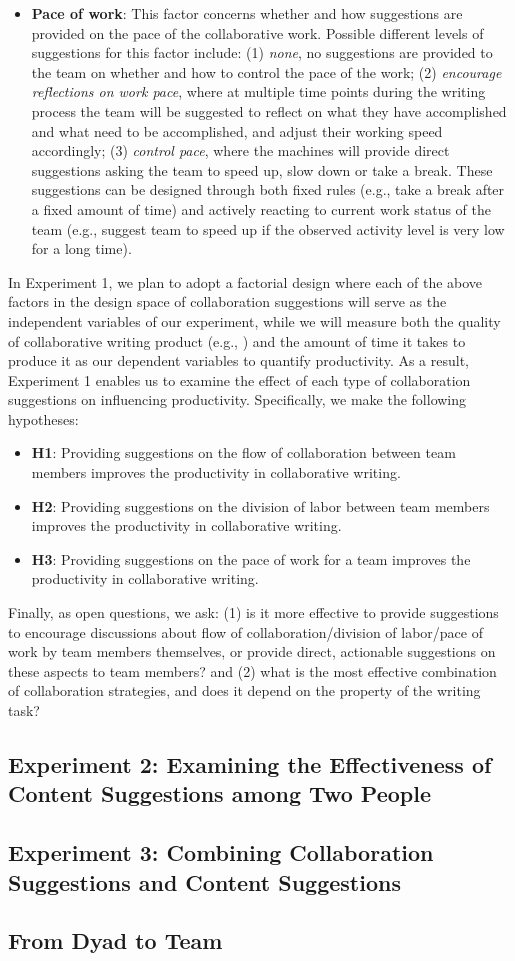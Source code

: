 \begin{itemize}
\item {\bf Pace of work}: This factor concerns whether and how suggestions are provided on the pace of the collaborative work. Possible different levels of suggestions for this factor include: (1) {\em none}, no suggestions are provided to the team on whether and how to control the pace of the work; (2) {\em encourage reflections on work pace}, where at multiple time points during the writing process the team will be suggested to reflect on what they have accomplished and what need to be accomplished, and adjust their working speed accordingly; (3) {\em control pace}, where the machines will provide direct suggestions asking the team to speed up, slow down or take a break. These suggestions can be designed through both fixed rules (e.g., take a break after a fixed amount of time) and actively reacting to current work status of the team (e.g., suggest team to speed up if the observed activity level is very low for a long time). 
\end{itemize}

In Experiment 1, we plan to adopt a factorial design where each of the above factors in the design space of collaboration suggestions will serve as the independent variables of our experiment, while we will measure both the quality of collaborative writing product (e.g., ) and the amount of time it takes to produce it as our dependent variables to quantify productivity. As a result, Experiment 1 enables us to examine the effect of each type of collaboration suggestions on influencing productivity. Specifically, we make the following hypotheses:
\begin{itemize}
\item{\bf H1}: Providing suggestions on the flow of collaboration between team members improves the productivity in collaborative writing.
\item{\bf H2}: Providing suggestions on the division of labor between team members improves the productivity in collaborative writing.
\item{\bf H3}: Providing suggestions on the pace of work for a team improves the productivity in collaborative writing.
\end{itemize}
Finally, as open questions, we ask: (1) is it more effective to provide suggestions to encourage discussions about flow of collaboration/division of labor/pace of work by team members themselves, or provide direct, actionable suggestions on these aspects to team members? and (2) what is the most effective combination of collaboration strategies, and does it depend on the property of the writing task?

\subsection{Experiment 2: Examining the Effectiveness of Content Suggestions among Two People}
\label{sec:exp2}

\subsection{Experiment 3: Combining Collaboration Suggestions and Content Suggestions}
\label{sec:exp3}


\subsection{From Dyad to Team}
\label{sec:exp4}